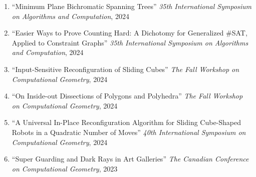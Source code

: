 \documentclass[letterpaper,11pt]{article}
\makeatletter
\newcommand{\resumeSubheading}[4]{%
  \item[]%
  \begin{tabularx}{\textwidth}{>{\raggedright\arraybackslash}X@{\hspace{0.5em}}r}
    {\bfseries{\textsc{#1}}} & #2 \\[2pt]
    {\small #3}               & {\small #4} \\
  \end{tabularx}%
}
\newcommand{\presentation}[3]{
  \item ``#1'' %
     \emph{#2}, %
      #3%


}
\newcommand{\pdficon}{\faFilePdf}
\makeatother
\begin{document}
\begin{enumerate}
  \presentation{Minimum Plane Bichromatic Spanning Trees}{35th International Symposium on Algorithms and Computation}{2024} \vspace{-.5em}  
  \presentation{Easier Ways to Prove Counting Hard: A Dichotomy for Generalized \#SAT, Applied to Constraint Graphs}{35th International Symposium on Algorithms and Computation}{2024} \vspace{-.5em}  
  \presentation{Input-Sensitive Reconfiguration of Sliding Cubes}{The Fall Workshop on Computational Geometry}{2024} \vspace{-.5em}  
  \presentation{On Inside-out Dissections of Polygons and Polyhedra}{The Fall Workshop on Computational Geometry}{2024} \vspace{-.5em}  
  \presentation{A Universal In-Place Reconfiguration Algorithm for Sliding Cube-Shaped Robots in a Quadratic Number of Moves}{40th International Symposium on Computational Geometry}{2024} \vspace{-.5em}  
  \presentation{Super Guarding and Dark Rays in Art Galleries}{The Canadian Conference on Computational Geometry}{2023} \vspace{-.5em}  

\end{enumerate}
\end{document}
